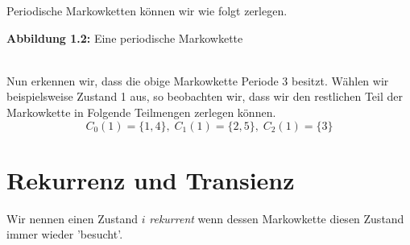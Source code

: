 \documentclass[a4paper]{article}
\begin{document}
Periodische Markowketten können wir wie folgt zerlegen.

\begin{center}
\end{center}
\qquad \caption{\textbf{Abbildung 1.2:} Eine periodische Markowkette}
\\

Nun erkennen wir, dass die obige Markowkette Periode 3 besitzt.
Wählen wir beispielsweise Zustand 1 aus, so beobachten wir, dass wir den restlichen Teil der Markowkette
in Folgende Teilmengen zerlegen können.
\[
	C_0(1) = \{
		1, 4
	\}, \; C_1 (1) = \{
		2, 5
	\}, \; C_2 (1) = \{
		3
	\} 
\]

\section{Rekurrenz und Transienz}
Wir nennen einen Zustand $i$ \textit{rekurrent} wenn dessen Markowkette diesen Zustand immer wieder 'besucht'.
\end{document}
